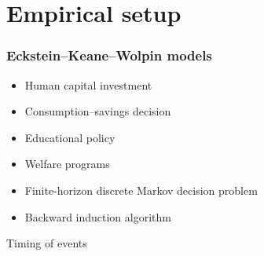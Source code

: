 \section{Empirical setup}\addtocounter{framenumber}{-1}
\begin{frame}\frametitle{Eckstein--Keane--Wolpin models}

\begin{multicols}{2}

	\vspace{0.3cm}
	\begin{itemize}\setlength\itemsep{1em}
		\item Human capital investment
		\item Consumption--savings decision
	\end{itemize}

    \pause

	\vspace{0.3cm}
	\begin{itemize}\setlength\itemsep{1em}
		\item Educational policy
		\item Welfare programs
	\end{itemize}

\end{multicols}

\pause
{}\vspace{0.3cm}
\begin{itemize}\setlength\itemsep{1em}
 \item Finite-horizon discrete Markov decision problem
 \item Backward induction algorithm
\end{itemize}

\end{frame}
\begin{frame}{Timing of events}
\vspace{0.5cm}
\scalebox{0.9}{\hspace{-0.2cm}}
\end{frame}
